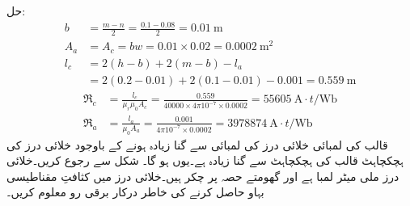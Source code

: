 حل:\quad
\begin{align*}
b&=\frac{m-n}{2}=\frac{0.1-0.08}{2}=\SI{0.01}{\meter}\\
A_a&=A_c=bw=0.01 \times 0.02=\SI{0.0002}{\square \meter}\\
l_c&=2(h-b)+2(m-b)-l_a\\
&=2(0.2-0.01)+2(0.1-0.01)-0.001=\SI{0.559}{\meter}
\end{align*}
%
\begin{align*}
\Re_c&=\frac{l_c}{\mu_r \mu_0 A_c}=\frac{0.559}{40000 \times 4 \pi 10^{-7} \times 0.0002}=\SI{55605}{\ampere \cdot t \per \weber}\\
\Re_a&=\frac{l_a}{\mu_0 A_a}=\frac{0.001}{4 \pi 10^{-7} \times 0.0002}=\SI{3978874}{\ampere \cdot t \per \weber}
\end{align*}
قالب کی لمبائی خلائی درز کی لمبائی سے  گنا زیادہ ہونے کے باوجود خلائی درز کی ہچکچاہٹ قالب کی ہچکچاہٹ سے  گنا زیادہ ہے۔یوں   ہو گا۔
%
شکل   سے رجوع کریں۔خلائی درز  ملی میٹر لمبا ہے اور گھومتے حصہ پر  چکر ہیں۔خلائی درز میں  کثافتِ مقناطیسی بہاو حاصل کرنے کی خاطر درکار برقی رو معلوم کریں۔
